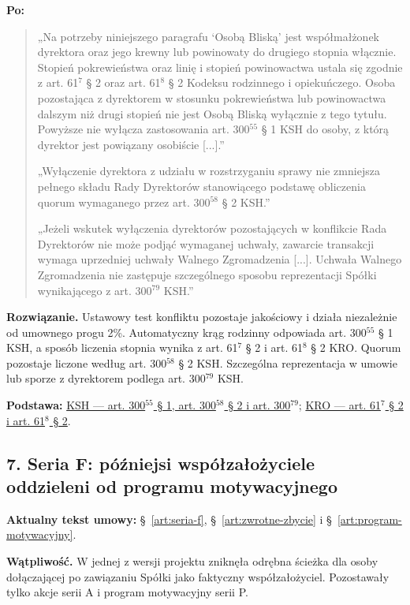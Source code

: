 \documentclass[12pt,a4paper]{report}
\newcounter{paragraf}
\begin{document}
\textbf{Po:}
\begin{quote}\small
„Na potrzeby niniejszego paragrafu `Osobą Bliską' jest współmałżonek dyrektora oraz jego krewny lub powinowaty do drugiego stopnia włącznie. Stopień pokrewieństwa oraz linię i stopień powinowactwa ustala się zgodnie z art. 61$^{7}$ § 2 oraz art. 61$^{8}$ § 2 Kodeksu rodzinnego i opiekuńczego. Osoba pozostająca z dyrektorem w stosunku pokrewieństwa lub powinowactwa dalszym niż drugi stopień nie jest Osobą Bliską wyłącznie z tego tytułu. Powyższe nie wyłącza zastosowania art. 300$^{55}$ § 1 KSH do osoby, z którą dyrektor jest powiązany osobiście [...].”

„Wyłączenie dyrektora z udziału w rozstrzyganiu sprawy nie zmniejsza pełnego składu Rady Dyrektorów stanowiącego podstawę obliczenia quorum wymaganego przez art. 300$^{58}$ § 2 KSH.”

„Jeżeli wskutek wyłączenia dyrektorów pozostających w konflikcie Rada Dyrektorów nie może podjąć wymaganej uchwały, zawarcie transakcji wymaga uprzedniej uchwały Walnego Zgromadzenia [...]. Uchwała Walnego Zgromadzenia nie zastępuje szczególnego sposobu reprezentacji Spółki wynikającego z art. 300$^{79}$ KSH.”
\end{quote}

\textbf{Rozwiązanie.} Ustawowy test konfliktu pozostaje jakościowy i działa niezależnie od umownego progu 2\%. Automatyczny krąg rodzinny odpowiada art. 300$^{55}$ § 1 KSH, a sposób liczenia stopnia wynika z art. 61$^{7}$ § 2 i art. 61$^{8}$ § 2 KRO. Quorum pozostaje liczone według art. 300$^{58}$ § 2 KSH. Szczególna reprezentacja w umowie lub sporze z dyrektorem podlega art. 300$^{79}$ KSH.

\textbf{Podstawa:} \href{https://eli.gov.pl/api/acts/DU/2024/18/text.html}{KSH --- art. 300$^{55}$ § 1, art. 300$^{58}$ § 2 i art. 300$^{79}$}; \href{https://eli.gov.pl/eli/DU/2026/236/ogl}{KRO --- art. 61$^{7}$ § 2 i art. 61$^{8}$ § 2}.

\subsection*{7. Seria F: późniejsi współzałożyciele oddzieleni od programu motywacyjnego}
\textbf{Aktualny tekst umowy:} §~\ref{art:seria-f}, §~\ref{art:zwrotne-zbycie} i §~\ref{art:program-motywacyjny}.

\textbf{Wątpliwość.} W jednej z wersji projektu zniknęła odrębna ścieżka dla osoby dołączającej po zawiązaniu Spółki jako faktyczny współzałożyciel. Pozostawały tylko akcje serii A i program motywacyjny serii P.
\end{document}
